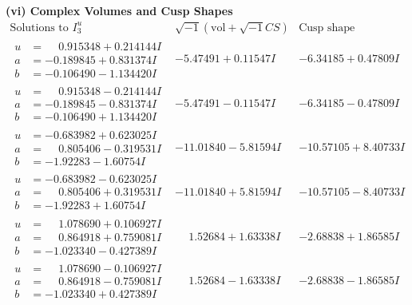 \documentclass[1p]{elsarticle_modified}
\theoremstyle{definition}
\newcommand{\I}{\sqrt{-1}}
\begin{document}
\newpage\flushleft \textbf{(vi) Complex Volumes and Cusp Shapes}
$$\begin{array}{c|c|c}  
\text{Solutions to }I^u_{3}& \I (\text{vol} + \sqrt{-1}CS) & \text{Cusp shape}\\
 \hline 
\begin{aligned}
u &= \phantom{-}0.915348 + 0.214144 I \\
a &= -0.189845 + 0.831374 I \\
b &= -0.106490 - 1.134420 I\end{aligned}
 & -5.47491 + 0.11547 I & -6.34185 + 0.47809 I \\ \hline\begin{aligned}
u &= \phantom{-}0.915348 - 0.214144 I \\
a &= -0.189845 - 0.831374 I \\
b &= -0.106490 + 1.134420 I\end{aligned}
 & -5.47491 - 0.11547 I & -6.34185 - 0.47809 I \\ \hline\begin{aligned}
u &= -0.683982 + 0.623025 I \\
a &= \phantom{-}0.805406 - 0.319531 I \\
b &= -1.92283 - 1.60754 I\end{aligned}
 & -11.01840 - 5.81594 I & -10.57105 + 8.40733 I \\ \hline\begin{aligned}
u &= -0.683982 - 0.623025 I \\
a &= \phantom{-}0.805406 + 0.319531 I \\
b &= -1.92283 + 1.60754 I\end{aligned}
 & -11.01840 + 5.81594 I & -10.57105 - 8.40733 I \\ \hline\begin{aligned}
u &= \phantom{-}1.078690 + 0.106927 I \\
a &= \phantom{-}0.864918 + 0.759081 I \\
b &= -1.023340 - 0.427389 I\end{aligned}
 & \phantom{-}1.52684 + 1.63338 I & -2.68838 + 1.86585 I \\ \hline\begin{aligned}
u &= \phantom{-}1.078690 - 0.106927 I \\
a &= \phantom{-}0.864918 - 0.759081 I \\
b &= -1.023340 + 0.427389 I\end{aligned}
 & \phantom{-}1.52684 - 1.63338 I & -2.68838 - 1.86585 I \\ \hline\begin{aligned}

\end{aligned}
\end{array}$$
\end{document}
